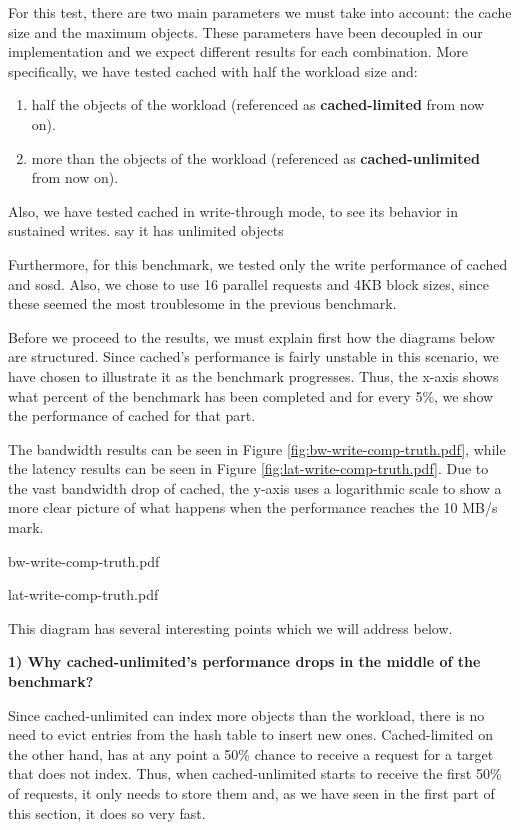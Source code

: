 For this test, there are two main parameters we must take into account: the 
cache size and the maximum objects. These parameters have been decoupled in our 
implementation and we expect different results for each combination. More 
specifically, we have tested cached with half the workload size and:

\begin{enumerate}
	\item half the objects of the workload (referenced as 
		\textbf{cached-limited} from now on).
	\item more than the objects of the workload (referenced as 
		\textbf{cached-unlimited} from now on).
\end{enumerate}

Also, we have tested cached in write-through mode, to see its behavior in 
sustained writes. \fixme say it has unlimited objects 

Furthermore, for this benchmark, we tested only the write performance of cached 
and sosd.  Also, we chose to use 16 parallel requests and 4KB block sizes, 
since these seemed the most troublesome in the previous benchmark.

Before we proceed to the results, we must explain first how the diagrams below 
are structured. Since cached's performance is fairly unstable in this scenario, 
we have chosen to illustrate it as the benchmark progresses.  Thus, the x-axis 
shows what percent of the benchmark has been completed and for every 5\%, we 
show the performance of cached for that part.

The bandwidth results can be seen in Figure \ref{fig:bw-write-comp-truth.pdf}, 
while the latency results can be seen in Figure 
\ref{fig:lat-write-comp-truth.pdf}.  Due to the vast bandwidth drop of cached, 
the y-axis uses a logarithmic scale to show a more clear picture of what 
happens when the performance reaches the 10 MB/s mark.

{bw-write-comp-truth.pdf}

{lat-write-comp-truth.pdf}

This diagram has several interesting points which we will address below.

\textbf{1) Why cached-unlimited's performance drops in the middle of the 
	benchmark?}

Since cached-unlimited can index more objects than the workload, there is no 
need to evict entries from the hash table to insert new ones. Cached-limited on 
the other hand, has at any point a 50\% chance to receive a request for a 
target that does not index. Thus, when cached-unlimited starts to receive the 
first 50\% of requests, it only needs to store them and, as we have seen in the 
first part of this section, it does so very fast.

